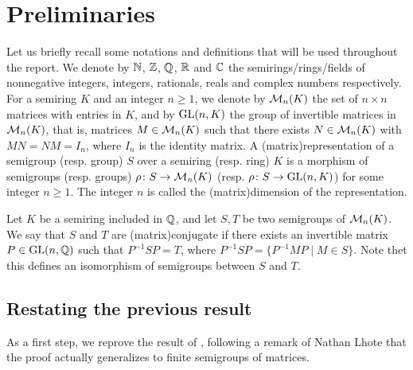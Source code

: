 \section{Preliminaries}

Let us briefly recall some notations and definitions that will be used
throughout the report. We denote by $\Nat$, $\Int$, $\Rat$, $\Real$ and $\Comp$
the semirings/rings/fields of nonnegative integers, integers, rationals, reals
and complex numbers respectively. For a semiring $K$ and an integer $n \geq 1$,
we denote by $\Mat[n]{K}$ the set of $n\times n$ matrices with entries in $K$,
and by $\GL[n]{K}$ the group of invertible matrices in $\Mat[n]{K}$, that is,
matrices $M \in \Mat[n]{K}$ such that there exists $N \in \Mat[n]{K}$ with $MN
= NM = I_n$, where $I_n$ is the identity matrix. A \intro(matrix){representation}
of a semigroup (resp. group) $S$ over a semiring (resp. ring) $K$ is a
morphism of semigroups (resp. groups) $\rho \colon S \to \Mat[n]{K}$ (resp.
$\rho \colon S \to \GL[n]{K}$) for some integer $n \geq 1$. The integer $n$ is
called the \intro(matrix){dimension} of the representation.


Let $K$ be a semiring included in $\Rat$, and let $S, T$ be two semigroups of
$\Mat[n]{K}$. We say that $S$ and $T$ are \intro(matrix){conjugate} if there
exists an invertible matrix $P \in \GL[n]{\Rat}$ such that $P^{-1}SP = T$,
where $P^{-1}SP = \{P^{-1}MP \mid M \in S\}$. Note thet this defines an
isomorphism of semigroups between $S$ and $T$.


\subsection{Restating the previous result}

As a first step, we reprove the result of \cite{BUHAKISTTA20}, following
a remark of Nathan Lhote that the proof actually generalizes to 
finite semigroups of matrices.

